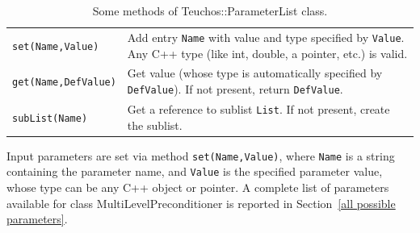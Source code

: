 \documentclass{article}[11pt]
\begin{document}
\begin{table}[htbp]
  \centering
  \begin{tabular}{| p{4cm} | p{10cm} |}
    \hline
    \verb!set(Name,Value)! & Add entry \verb!Name! with value and type
    specified by \verb!Value!. Any C++ type (like int, double, a
    pointer, etc.) is valid. \\
    \verb!get(Name,DefValue)! & Get value (whose type is automatically
    specified by \verb!DefValue!). If not present, return
    \verb!DefValue!. \\
    \verb!subList(Name)! & Get a reference to sublist \verb!List!. If not
    present, create the sublist. \\
    \hline
  \end{tabular}
  \caption{Some methods of Teuchos::ParameterList class.}
  \label{tab:teuchos}
\end{table}

Input parameters are set via method \verb!set(Name,Value)!, where
\verb!Name! is a string containing the parameter name, and \verb!Value! is the
specified parameter value, whose type can be any C++ object or pointer. 
A complete
list of parameters available for class MultiLevelPreconditioner is
reported in Section~\ref{all possible parameters}.
\end{document}
